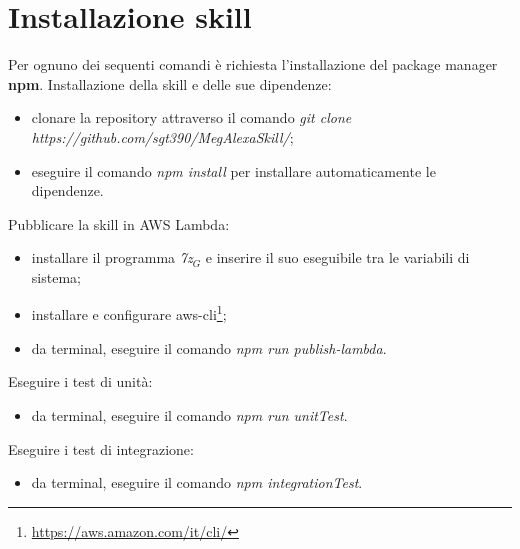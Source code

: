 \newpage
\section{Installazione skill}
\label{installazioneSkill}
Per ognuno dei sequenti comandi è richiesta l'installazione del package manager \textbf{npm}.
Installazione della skill e delle sue dipendenze:
\begin{itemize}
    \item clonare la repository attraverso il comando \textit{git clone\\https://github.com/sgt390/MegAlexaSkill/};
    \item eseguire il comando \textit{npm install} per installare automaticamente le dipendenze.
\end{itemize}
Pubblicare la skill in AWS Lambda:
\begin{itemize}
    \item installare il programma \textit{7z$_{G}$} e inserire il suo eseguibile tra le variabili di sistema;
    \item installare e configurare aws-cli\footnote{\url{https://aws.amazon.com/it/cli/}};
    \item da terminal, eseguire il comando \textit{npm run publish-lambda}.
\end{itemize}
Eseguire i test di unità:
\begin{itemize}
    \item da terminal, eseguire il comando \textit{npm run unitTest}.
\end{itemize}
Eseguire i test di integrazione:
\begin{itemize}
    \item da terminal, eseguire il comando \textit{npm integrationTest}.
\end{itemize}
